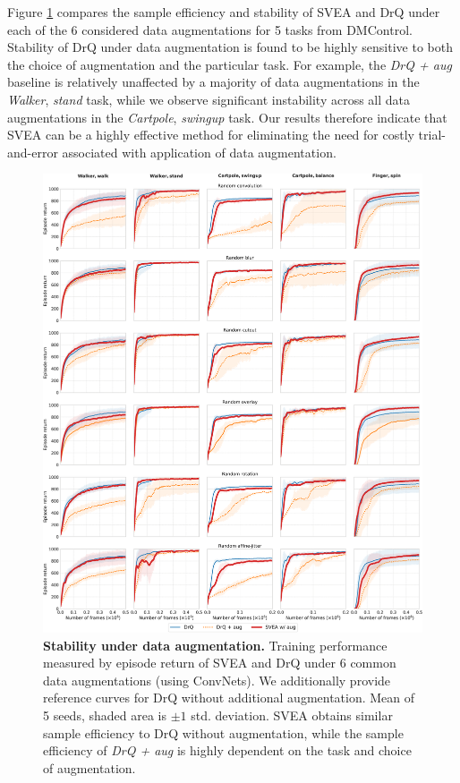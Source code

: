 Figure \ref{fig:drq-augs-suppl} compares the sample efficiency and stability of SVEA and DrQ under each of the 6 considered data augmentations for 5 tasks from DMControl. Stability of DrQ under data augmentation is found to be highly sensitive to both the choice of augmentation and the particular task. For example, the \textit{DrQ + aug} baseline is relatively unaffected by a majority of data augmentations in the \textit{Walker}, \textit{stand} task, while we observe significant instability across all data augmentations in the \textit{Cartpole}, \textit{swingup} task. Our results therefore indicate that SVEA can be a highly effective method for eliminating the need for costly trial-and-error associated with application of data augmentation.
\begin{figure}[H]
    \centering
    \includegraphics[width=\textwidth]{figures/drq_augs_suppl.png}
    \caption{\textbf{Stability under data augmentation.} Training performance measured by episode return of SVEA and DrQ under 6 common data augmentations (using ConvNets). We additionally provide reference curves for DrQ without additional augmentation. Mean of 5 seeds, shaded area is $\pm1$ std. deviation. SVEA obtains similar sample efficiency to DrQ without augmentation, while the sample efficiency of \textit{DrQ + aug} is highly dependent on the task and choice of augmentation.}
    \label{fig:drq-augs-suppl}
    \vspace{-0.1in}
\end{figure}